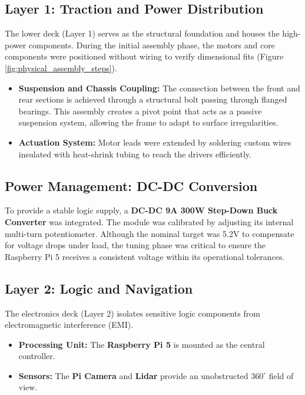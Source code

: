 \subsection{Layer 1: Traction and Power Distribution}
The lower deck (Layer 1) serves as the structural foundation and houses the high-power components. During the initial assembly phase, the motors and core components were positioned without wiring to verify dimensional fits (Figure \ref{fig:physical_assembly_steps}).
\begin{itemize}
    \item \textbf{Suspension and Chassis Coupling:} The connection between the front and rear sections is achieved through a structural bolt passing through flanged bearings. This assembly creates a pivot point that acts as a passive suspension system, allowing the frame to adapt to surface irregularities.
    \item \textbf{Actuation System:} Motor leads were extended by soldering custom wires insulated with heat-shrink tubing to reach the drivers efficiently.
\end{itemize}

\subsection{Power Management: DC-DC Conversion}
To provide a stable logic supply, a \textbf{DC-DC 9A 300W Step-Down Buck Converter} was integrated. The module was calibrated by adjusting its internal multi-turn potentiometer. Although the nominal target was 5.2V to compensate for voltage drops under load, the tuning phase was critical to ensure the Raspberry Pi 5 receives a consistent voltage within its operational tolerances.

\subsection{Layer 2: Logic and Navigation}
The electronics deck (Layer 2) isolates sensitive logic components from electromagnetic interference (EMI). 
\begin{itemize}
    \item \textbf{Processing Unit:} The \textbf{Raspberry Pi 5} is mounted as the central controller.
    \item \textbf{Sensors:} The \textbf{Pi Camera} and \textbf{Lidar} provide an unobstructed $360^{\circ}$ field of view.
\end{itemize}

